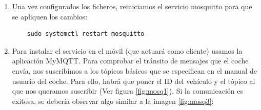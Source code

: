 \begin{enumerate}
\item Una vez configurados los ficheros, reiniciamos el servicio mosquitto para que se apliquen los cambios:
\begin{lstlisting}
	sudo systemctl restart mosquitto
\end{lstlisting}

\item Para instalar el servicio en el móvil (que actuará como cliente) usamos la aplicación MyMQTT. Para comprobar el tránsito de mensajes que el coche envía, nos suscribimos a los tópicos básicos que se especifican en el manual de usuario del coche. Para ello, habrá que poner el ID del vehículo y el tópico al que nos queramos suscribir (Ver figura \ref{fig:mosq1}). Si la comunicación es exitosa, se debería observar algo similar a la imagen \ref{fig:mosq3}:


\end{enumerate}
